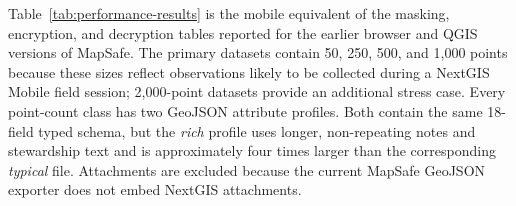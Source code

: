 \documentclass[]{interact}
\begin{document}
Table~\ref{tab:performance-results} is the mobile equivalent of the masking, encryption, and decryption tables reported for the earlier browser and QGIS versions of MapSafe. The primary datasets contain 50, 250, 500, and 1,000 points because these sizes reflect observations likely to be collected during a NextGIS Mobile field session; 2,000-point datasets provide an additional stress case. Every point-count class has two GeoJSON attribute profiles. Both contain the same 18-field typed schema, but the \emph{rich} profile uses longer, non-repeating notes and stewardship text and is approximately four times larger than the corresponding \emph{typical} file. Attachments are excluded because the current MapSafe GeoJSON exporter does not embed NextGIS attachments.

%
\end{document}
